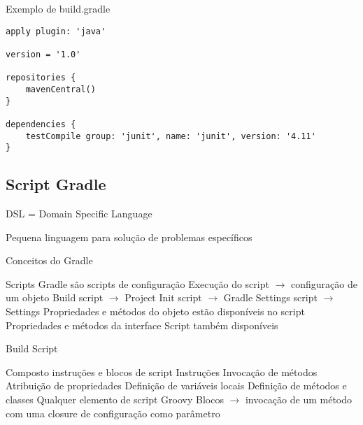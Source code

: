 \documentclass{beamer}
\begin{document}
\begin{frame}[fragile]{Exemplo de build.gradle}
 \begin{verbatim}
apply plugin: 'java'
 
version = '1.0'
 
repositories {
    mavenCentral()
}
 
dependencies {
    testCompile group: 'junit', name: 'junit', version: '4.11'
}
  \end{verbatim}
\end{frame}

\subsection{Script Gradle}

\begin{frame}{DSL = Domain Specific Language}
 \begin{outline}
    Pequena linguagem para solução de problemas específicos
  \0
 \end{outline}
\end{frame}

\begin{frame}{Conceitos do Gradle}
 \begin{outline}
    Scripts Gradle são \alert{scripts de configuração}
     Execução do script $\rightarrow$ configuração de um \alert{objeto}
       Build script $\rightarrow$ \alert{Project}
       Init script $\rightarrow$ \alert{Gradle}
       Settings script $\rightarrow$ \alert{Settings}
     Propriedades e métodos do \alert{objeto} estão disponíveis no script
     Propriedades e métodos da interface \alert{Script} também disponíveis
 \end{outline}
\end{frame}

\begin{frame}{Build Script}
 \begin{outline}
    Composto \alert{instruções} e \alert{blocos} de script
    \alert{Instruções}
    \2 Invocação de métodos
    \2 Atribuição de propriedades
    \2 Definição de variáveis locais
    \2 Definição de métodos e classes
    \2 \alert{Qualquer elemento de script Groovy}
    \alert{Blocos} $\rightarrow$ invocação de um método com uma \alert{closure de configuração} como parâmetro
 \end{outline}
\end{frame}
\end{document}
